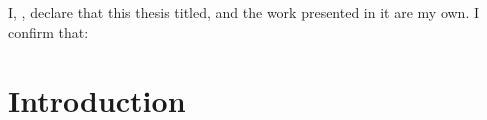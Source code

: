 \documentclass[
11pt, %
oneside, %
english, %
singlespacing, %
]{macthesis} %
\begin{document}
\listoffigures %

\listoftables %



\begin{declaration}
\addchaptertocentry{\authorshipname}

\noindent I, \authorname, declare that this thesis titled, \emph{\ttitle} and the work presented in it are my own. I confirm that:



\end{declaration}


\label{lastoffront}
\clearpage


\mainmatter %
\pagestyle{thesis}
\chapter*{Introduction}\label{introduction}
\end{document}
